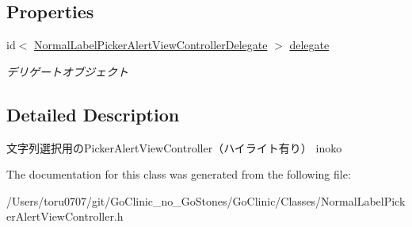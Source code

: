 \subsection*{Properties}
\begin{DoxyCompactItemize}
\item 
\hypertarget{interface_normal_label_picker_alert_view_controller_a76757b0a682a13a9fcaa08258a25ade6}{
id$<$ \hyperlink{protocol_normal_label_picker_alert_view_controller_delegate-p}{NormalLabelPickerAlertViewControllerDelegate} $>$ \hyperlink{interface_normal_label_picker_alert_view_controller_a76757b0a682a13a9fcaa08258a25ade6}{delegate}}
\label{interface_normal_label_picker_alert_view_controller_a76757b0a682a13a9fcaa08258a25ade6}

\begin{DoxyCompactList}\small\item\em デリゲートオブジェクト \end{DoxyCompactList}\end{DoxyCompactItemize}


\subsection{Detailed Description}
文字列選択用のPickerAlertViewController（ハイライト有り）  inoko 

The documentation for this class was generated from the following file:\begin{DoxyCompactItemize}
\item 
/Users/toru0707/git/GoClinic\_\-no\_\-GoStones/GoClinic/Classes/NormalLabelPickerAlertViewController.h\end{DoxyCompactItemize}
